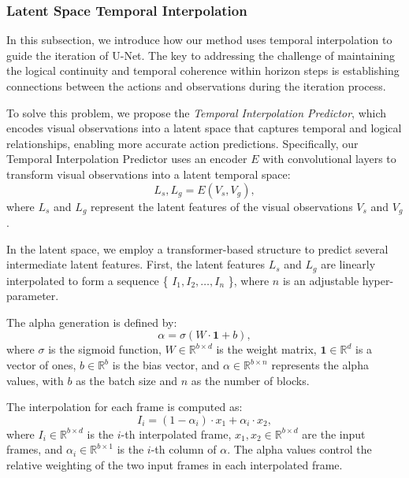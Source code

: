 \subsubsection{Latent Space Temporal Interpolation}
In this subsection, we introduce how our method uses temporal interpolation to guide the iteration of U-Net. The key to addressing the challenge of maintaining the logical continuity and temporal coherence within horizon steps is establishing connections between the actions and observations during the iteration process. 

To solve this problem, we propose the \textit{Temporal Interpolation Predictor}, which encodes visual observations into a latent space that captures temporal and logical relationships, enabling more accurate action predictions. Specifically, our Temporal Interpolation Predictor uses an encoder $E$ with convolutional layers to transform visual observations into a latent temporal space:
\begin{equation}
L_s, L_g = E(V_s, V_g),
\end{equation}
where $L_s$ and $L_g$ represent the latent features of the visual observations $V_s$ and $V_g$.

In the latent space, we employ a transformer-based structure to predict several intermediate latent features. First, the latent features $L_s$ and $L_g$ are linearly interpolated to form a sequence \{ $I_1, I_2, \dots, I_n$ \}, where $n$ is an adjustable hyper-parameter. 

The alpha generation is defined by:
\begin{equation}
\alpha = \sigma(W \cdot \mathbf{1} + b),
\end{equation}
where $\sigma$ is the sigmoid function, $W \in \mathbb{R}^{b \times d}$ is the weight matrix, $\mathbf{1} \in \mathbb{R}^d$ is a vector of ones, $b \in \mathbb{R}^b$ is the bias vector, and $\alpha \in \mathbb{R}^{b \times n}$ represents the alpha values, with $b$ as the batch size and $n$ as the number of blocks.

The interpolation for each frame is computed as:
\begin{equation}
I_i = (1 - \alpha_i) \cdot x_1 + \alpha_i \cdot x_2,
\end{equation}
where $I_i \in \mathbb{R}^{b \times d}$ is the $i$-th interpolated frame, $x_1, x_2 \in \mathbb{R}^{b \times d}$ are the input frames, and $\alpha_i \in \mathbb{R}^{b \times 1}$ is the $i$-th column of $\alpha$. The alpha values control the relative weighting of the two input frames in each interpolated frame.

